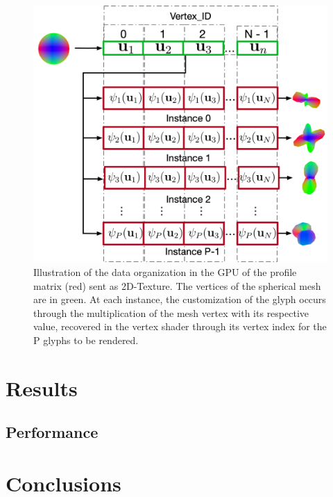 \documentclass[twoside,twocolumn,10pt]{article}
\begin{document}
\begin{figure}[htb]
    \centering
    \includegraphics[width=1.0\linewidth, angle=0]{figs/rendering_scheme/GPU2Glyph.png}
    \caption{Illustration of the data organization in the GPU of the profile matrix (red) sent as 2D-Texture. The vertices of the spherical mesh are in green. At each instance, the customization of the glyph occurs through the multiplication of the mesh vertex with its respective value, recovered in the vertex shader through its vertex index for the P glyphs to be rendered.}
    \label{fig::GPU2glyph}
\end{figure}

\section{Results}

\subsection{Performance}


\section{Conclusions}







\end{document}
